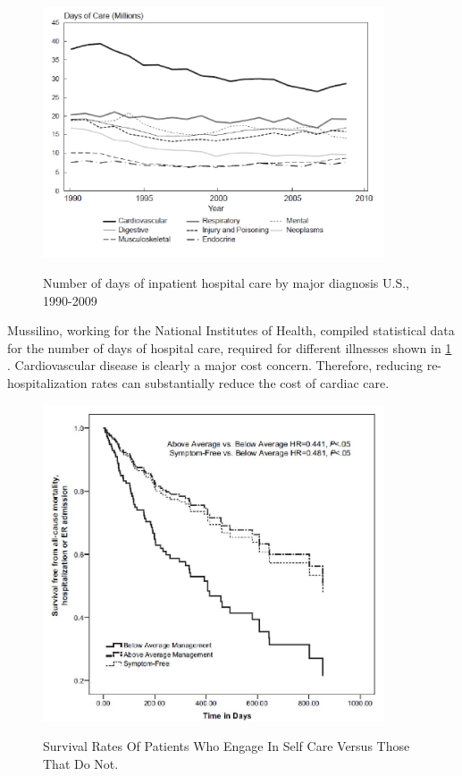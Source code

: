 \begin{figure}
	\begin{center}
		\label{fig:DaysofCare}
		\includegraphics[scale=1,width=0.9\textwidth]{Images/DaysOfCare.png} 
		\caption{Number of days of inpatient hospital care by major diagnosis U.S., 1990-2009 }
	\end{center}
\end{figure}

Mussilino, working for the National Institutes of Health, compiled statistical data for the number of days of hospital care, required for different illnesses shown in  \cref{fig:DaysofCare} \cite{Mussolino2012}. Cardiovascular disease is clearly a major cost concern. Therefore, reducing re-hospitalization rates can substantially reduce the cost of cardiac care.


\begin{figure}
	\begin{center}
		\label{fig:SurvivalRates}
		\includegraphics[scale=1,width=0.9\textwidth]{Images/SurvivalRate.jpg} 
		\caption{Survival Rates Of Patients Who Engage In Self Care Versus Those That Do Not.}
	\end{center}
\end{figure}


